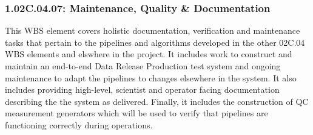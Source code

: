 \subsubsection*{1.02C.04.07: Maintenance, Quality \& Documentation}

This WBS element covers holistic documentation, verification and
maintenance tasks that pertain to the pipelines and algorithms developed
in the other 02C.04 WBS elements and elswhere in the project. It
includes work to construct and maintain an end-to-end Data Release
Production test system and ongoing maintenance to adapt the pipelines to
changes elsewhere in the system. It also includes providing high-level,
scientist and operator facing documentation describing the the system as
delivered. Finally, it includes the construction of QC measurement generators
which will be used to verify that pipelines are functioning correctly during
operations.
